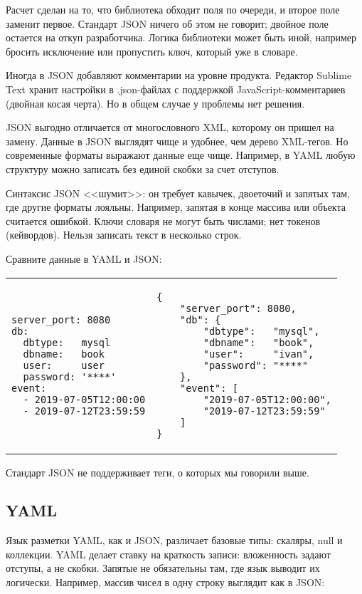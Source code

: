 Расчет сделан на то, что библиотека обходит поля по очереди, и второе поле
заменит первое. Стандарт JSON ничего об этом не говорит; двойное поле остается
на откуп разработчика. Логика библиотеки может быть иной, например бросить
исключение или пропустить ключ, который уже в словаре.

Иногда в JSON добавляют комментарии на уровне продукта. Редактор Sublime Text
хранит настройки в .json-файлах с поддержкой JavaScript-комментариев (двойная
косая черта). Но в общем случае у проблемы нет решения.

JSON выгодно отличается от многословного XML, которому он пришел на
замену. Данные в JSON выглядят чище и удобнее, чем дерево XML-тегов. Но
современные форматы выражают данные еще чище. Например, в YAML любую структуру
можно записать без единой скобки за счет отступов.

Синтаксис JSON <<шумит>>: он требует кавычек, двоеточий и запятых там, где
другие форматы лояльны. Например, запятая в конце массива или объекта считается
ошибкой. Ключи словаря не могут быть числами; нет токенов (кейвордов). Нельзя
записать текст в несколько строк.

Сравните данные в YAML и JSON:

\noindent
\begin{tabular}{ p{5cm} p{5cm} }

\begin{verbatim}
server_port: 8080
db:
  dbtype:   mysql
  dbname:   book
  user:     user
  password: '****'
event:
  - 2019-07-05T12:00:00
  - 2019-07-12T23:59:59
\end{verbatim}

&

\begin{verbatim}
{
    "server_port": 8080,
    "db": {
        "dbtype":   "mysql",
        "dbname":   "book",
        "user":     "ivan",
        "password": "****"
    },
    "event": [
        "2019-07-05T12:00:00",
        "2019-07-12T23:59:59"
    ]
}
\end{verbatim}

\end{tabular}

Стандарт JSON не поддерживает теги, о которых мы говорили выше.

\subsection{YAML}

Язык разметки YAML, как и JSON, различает базовые типы: скаляры, null и
коллекции. YAML делает ставку на краткость записи: вложенность задают отступы, а
не скобки. Запятые не обязательны там, где язык выводит их логически. Например,
массив чисел в одну строку выглядит как в JSON:

